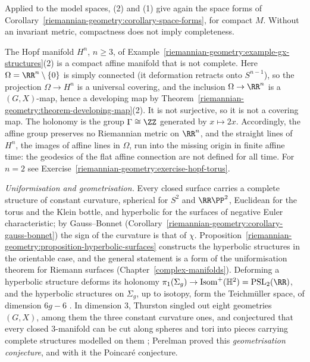 Applied to the model spaces, (2) and (1) give again the space forms of Corollary~\ref{riemannian-geometry:corollary-space-forms}, for compact $M$. Without an invariant metric, compactness does not imply completeness.

\begin{example}\label{riemannian-geometry:example-hopf-incomplete}
The Hopf manifold $H^n$, $n \geq 3$, of Example~\ref{riemannian-geometry:example-gx-structures}(2) is a compact affine manifold that is not complete. Here $\Omega = \RR^n \setminus \{0\}$ is simply connected (it deformation retracts onto
$S^{n-1}$), so the projection $\Omega \to H^n$ is a universal covering, and the inclusion $\Omega \to \RR^n$ is a $(G, X)$-map, hence a developing map by Theorem~\ref{riemannian-geometry:theorem-developing-map}(2). It is not surjective,
so it is not a covering map. The holonomy is the group $\Gamma \cong \ZZ$ generated by $x \mapsto 2x$. Accordingly, the affine group preserves no Riemannian metric on $\RR^n$, and the straight lines of $H^n$, the images of affine
lines in $\Omega$, run into the missing origin in finite affine time: the geodesics of the flat affine connection are not defined for all time. For $n = 2$ see Exercise~\ref{riemannian-geometry:exercise-hopf-torus}.
\end{example}

\begin{remark}\label{riemannian-geometry:remark-geometrisation}
\emph{Uniformisation and geometrisation.} Every closed surface carries a complete structure of constant curvature, spherical for $S^2$ and $\RR\PP^2$, Euclidean for the torus and the Klein bottle, and hyperbolic for the surfaces of
negative Euler characteristic; by Gauss--Bonnet (Corollary~\ref{riemannian-geometry:corollary-gauss-bonnet}) the sign of the curvature is that of $\chi$. Proposition~\ref{riemannian-geometry:proposition-hyperbolic-surfaces}
constructs the hyperbolic structures in the orientable case, and the general statement is a form of the uniformisation theorem for Riemann surfaces (Chapter~\ref{complex-manifolds}). Deforming a hyperbolic structure deforms its
holonomy $\pi_1(\Sigma_g) \to \mathrm{Isom}^+(\mathbb{H}^2) = \mathrm{PSL}_2(\RR)$, and the hyperbolic structures on $\Sigma_g$, up to isotopy, form the Teichm\"uller space, of dimension $6g - 6$ \cite{goldman-2022}. In dimension $3$,
Thurston singled out eight geometries $(G, X)$, among them the three constant curvature ones, and conjectured that every closed $3$-manifold can be cut along spheres and tori into pieces carrying complete
structures modelled on them \cite{thurston-1997}; Perelman proved this \emph{geometrisation conjecture}, and with it the Poincar\'e conjecture.
\end{remark}

